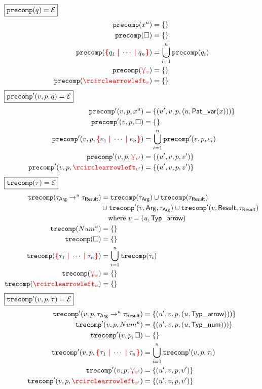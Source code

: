 %
$\boxed{\operatorname{\texttt{precomp}}\mathopen{}\left(q\right)\mathclose{} = \mathcal{E}}$
%
\begin{align*}
  \precomp{\varPat{x}{u}} &= \SetOf{}
  \\
  \precomp{\hole} &= \SetOf{}
  \\
  \precomp{\conflictHole{q_1, \cdots, q_n}}
  &= \bigcup_{i=1}^n \precomp{q_i}
  \\
  \precomp{\multiVertex{v}} &= \SetOf{}
  \\
  \precomp{\cycleVertex{v}} &= \SetOf{}
\end{align*}
%
$\boxed{\operatorname{\operatorname{\texttt{precomp}}^\prime}\mathopen{}\left(v, p, q\right)\mathclose{} = \mathcal{E}}$
%
\begin{align*}
  \precompPrime{v}{p}{\varPat{x}{u}}
  &= \SetOf{(u', v, p, (u, \PatVar(x)))}
  \\
  \precompPrime{v}{p}{\hole} &= \SetOf{}
  \\
  \precompPrime{v}{p}{\conflictHole{e_1, \cdots, e_n}}
  &= \bigcup_{i=1}^n \precompPrime{v}{p}{e_i}
  \\
  \precompPrime{v}{p}{\multiVertex{v'}}
  &= \SetOf{(u', v, p, v')}
  \\
  \precompPrime{v}{p}{\cycleVertex{v'}}
  &= \SetOf{(u', v, p, v')}
\end{align*}
%
$\boxed{\operatorname{\texttt{trecomp}}\mathopen{}\left(\tau\right)\mathclose{} = \mathcal{E}}$
%
\begin{align*}
  \trecomp{\arrowTyp{\tau_\ArrowArg}{u}{\tau_\ArrowResult}}
  &= \trecomp{\tau_\ArrowArg}
  \cup \trecomp{\tau_\ArrowResult} \\
  &\cup \trecompPrime{v}{\ArrowArg}{\tau_\ArrowArg}
  \cup \trecompPrime{v}{\ArrowResult}{\tau_\ArrowResult} \\
  &\quad\text{where } v = (u, \TypArrow)
  \\
  \trecomp{\numTyp{u}} &= \SetOf{}
  \\
  \trecomp{\hole} &= \SetOf{}
  \\
  \trecomp{\conflictHole{\tau_1, \cdots, \tau_n}}
  &= \bigcup_{i=1}^n \trecomp{\tau_i}
  \\
  \trecomp{\multiVertex{u}} &= \SetOf{}
  \\
  \trecomp{\cycleVertex{u}} &= \SetOf{}
\end{align*}
%
$\boxed{\operatorname{\operatorname{\texttt{trecomp}}^\prime}\mathopen{}\left(v, p, \tau\right)\mathclose{} = \mathcal{E}}$
%
\begin{align*}
  \trecompPrime{v}{p}{\arrowTyp{\tau_\ArrowArg}{u}{\tau_\ArrowResult}}
  &= \SetOf{(u', v, p, (u, \TypArrow)))}
  \\
  \trecompPrime{v}{p}{\numTyp{u}}
  &= \SetOf{(u', v, p, (u, \TypNum)))}
  \\
  \trecompPrime{v}{p}{\hole} &= \SetOf{}
  \\
  \trecompPrime{v}{p}{\conflictHole{\tau_1, \cdots, \tau_n}}
  &= \bigcup_{i=1}^n \trecompPrime{v}{p}{\tau_i}
  \\
  \trecompPrime{v}{p}{\multiVertex{v'}}
  &= \SetOf{(u', v, p, v')}
  \\
  \trecompPrime{v}{p}{\cycleVertex{v'}}
  &= \SetOf{(u', v, p, v')}
\end{align*}

